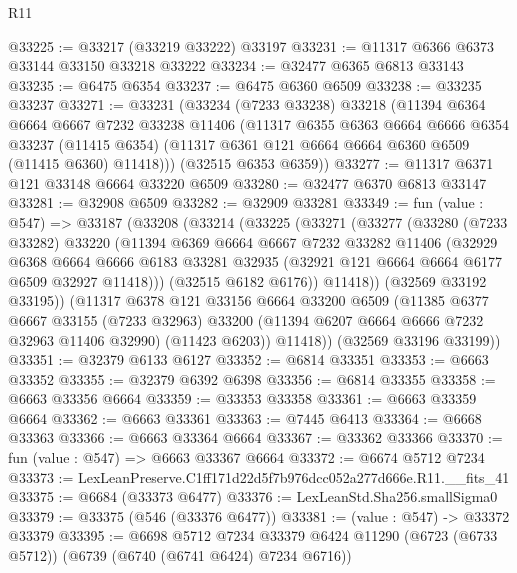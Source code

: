 \begin{lexlean}{R11}
\begin{coremodule}
@33225 := @33217 (@33219 @33222) @33197
@33231 := @11317 @6366 @6373 @33144 @33150 @33218 @33222
@33234 := @32477 @6365 @6813 @33143
@33235 := @6475 @6354
@33237 := @6475 @6360 @6509
@33238 := @33235 @33237
@33271 := @33231
    (@33234
      (@7233 @33238)
      @33218
      (@11394
        @6364
        @6664
        @6667
        @7232
        @33238
        @11406
        (@11317
          @6355
          @6363
          @6664
          @6666
          @6354
          @33237
          (@11415 @6354)
          (@11317 @6361 @121 @6664 @6664 @6360 @6509 (@11415 @6360) @11418)))
      (@32515 @6353 @6359))
@33277 := @11317 @6371 @121 @33148 @6664 @33220 @6509
@33280 := @32477 @6370 @6813 @33147
@33281 := @32908 @6509
@33282 := @32909 @33281
@33349 := fun (value : @547) =>
  @33187
    (@33208
      (@33214
        (@33225
          (@33271
            (@33277
              (@33280
                (@7233 @33282)
                @33220
                (@11394
                  @6369
                  @6664
                  @6667
                  @7232
                  @33282
                  @11406
                  (@32929
                    @6368
                    @6664
                    @6666
                    @6183
                    @33281
                    @32935
                    (@32921 @121 @6664 @6664 @6177 @6509 @32927 @11418)))
                (@32515 @6182 @6176))
              @11418))
          (@32569 @33192 @33195))
        (@11317
          @6378
          @121
          @33156
          @6664
          @33200
          @6509
          (@11385
            @6377
            @6667
            @33155
            (@7233 @32963)
            @33200
            (@11394 @6207 @6664 @6666 @7232 @32963 @11406 @32990)
            (@11423 @6203))
          @11418))
      (@32569 @33196 @33199))
@33351 := @32379 @6133 @6127
@33352 := @6814 @33351
@33353 := @6663 @33352
@33355 := @32379 @6392 @6398
@33356 := @6814 @33355
@33358 := @6663 @33356 @6664
@33359 := @33353 @33358
@33361 := @6663 @33359 @6664
@33362 := @6663 @33361
@33363 := @7445 @6413
@33364 := @6668 @33363
@33366 := @6663 @33364 @6664
@33367 := @33362 @33366
@33370 := fun (value : @547) => @6663 @33367 @6664
@33372 := @6674 @5712 @7234
@33373 := LexLeanPreserve.C1ff171d22d5f7b976dcc052a277d666e.R11.__fits_41
@33375 := @6684 (@33373 @6477)
@33376 := LexLeanStd.Sha256.smallSigma0
@33379 := @33375 (@546 (@33376 @6477))
@33381 := (value : @547) -> @33372 @33379
@33395 := @6698
    @5712
    @7234
    @33379
    @6424
    @11290
    (@6723 (@6733 @5712))
    (@6739 (@6740 (@6741 @6424) @7234 @6716))

\end{coremodule}
\end{lexlean}
